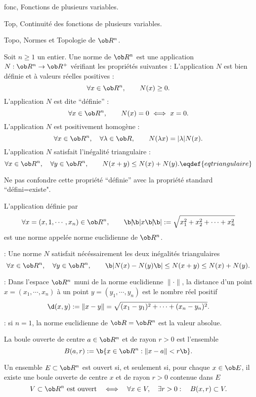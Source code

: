 
\pagetitretrue


\Chapter fonc, Fonctions de plusieurs variables. 
\bigskip


\Section Top, Continuité des fonctions de plusieurs variables.


\Subsection Topo, Normes et Topologie de $\ob R^n$. 

\Definition []  Soit $n\ge1$ un entier. Une norme de $\ob R^n$ est une application $N:\ob R^n\to\ob R^+$ vérifiant les propriétés suivantes : 
\Bullet L'application $N$ est bien définie et à valeurs réelles positives :
$$
\forall x\in\ob R^n,  \qquad N(x)\ge0 .
$$
\Bullet L'application $N$ est dite ``définie'' :
$$
\forall x\in\ob R^n , \qquad N(x)=0\ \Longleftrightarrow\ x=0 .
$$
\Bullet L'application $N$ est positivement homogène :
$$
\forall x\in\ob R^n , \quad  \forall \lambda\in\ob R ,\qquad N(\lambda x)=|\lambda|N(x).
$$
\Bullet L'application $N$ satisfait l'inégalité triangulaire :
$$
\forall x\in\ob R^n , \quad  \forall y\in\ob R^n , \qquad N(x+y)\le N(x)+N(y).\eqdef{eqtriangulaire}
$$

 Ne pas confondre cette propriété ``définie'' avec la propriété standard ``défini=existe". 
\medskip 


\Propriete []  L'application définie par 
$$
\forall x=(x,1,\cdots, x_n)\in\ob R^n, \qquad \b|\!\b|x\b|\!\b|:=\sqrt{x_1^2+x_2^2+\cdots+x_n^2}
$$
est une norme appelée norme euclidienne de $\ob R^n$. 
\bigskip


\Remarque :  Une norme $N$ satisfait nécéssairement les deux inégalités triangulaires 
$$
\forall x\in\ob R^n , \quad  \forall y\in\ob R^n , \qquad\b|N(x)-N(y)\b|\le N(x+y)\le N(x)+N(y).
$$


\Remarque :  Dans l'espace $\ob R^n$ muni de la norme euclidienne $\|\cdot\|$, la distance d'un point $x=(x_1,\cdots,x_n)$ à un point $y=(y_1,\cdots,y_n)$ 
est le nombre réel positif 
$$
\d(x,y):=\|x-y\|=\sqrt{(x_1-y_1)^2+\cdots+(x_n-y_n)^2}.
$$


\Remarque :  si $n=1$, la norme euclidienne de $\ob R=\ob R^n$ est la valeur absolue. 
\bigskip



\Definition []  La boule ouverte de centre $a\in\ob R^n$ et de rayon $r>0$ est l'ensemble 
$$
{
\sc B(a,r):=\b\{x\in\ob R^n:\|x-a\|<r\b\}}.
$$


\Definition []  Un ensemble $E\subset\ob R^n$ est ouvert si, et seulement si, pour chaque $x\in\ob E$, il existe une boule ouverte de centre $x$ et de rayon $r>0$ contenue dans $E$
$$
V\subset\ob R^n\mbox{ est ouvert}\quad\Longleftrightarrow\quad\forall x\in V, \quad \exists r>0:\quad \sc B(x,r)\subset V.
$$


